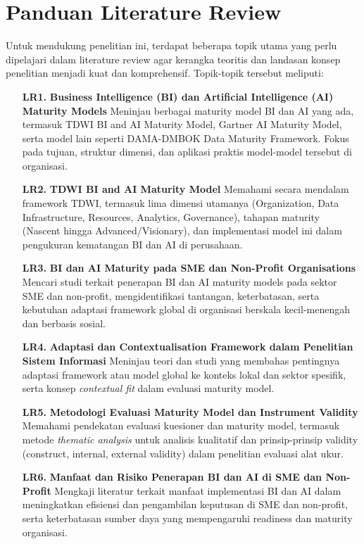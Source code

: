 \documentclass{article}
\begin{document}
\section{Panduan Literature Review}
Untuk mendukung penelitian ini, terdapat beberapa topik utama yang perlu dipelajari dalam literature review agar kerangka teoritis dan landasan konsep penelitian menjadi kuat dan komprehensif. Topik-topik tersebut meliputi:

\begin{enumerate}
	\item[\textbf{LR1.}] \textbf{Business Intelligence (BI) dan Artificial Intelligence (AI) Maturity Models}  
	Meninjau berbagai maturity model BI dan AI yang ada, termasuk TDWI BI and AI Maturity Model, Gartner AI Maturity Model, serta model lain seperti DAMA-DMBOK Data Maturity Framework. Fokus pada tujuan, struktur dimensi, dan aplikasi praktis model-model tersebut di organisasi.
	
	\item[\textbf{LR2.}] \textbf{TDWI BI and AI Maturity Model}  
	Memahami secara mendalam framework TDWI, termasuk lima dimensi utamanya (Organization, Data Infrastructure, Resources, Analytics, Governance), tahapan maturity (Nascent hingga Advanced/Visionary), dan implementasi model ini dalam pengukuran kematangan BI dan AI di perusahaan.
	
	\item[\textbf{LR3.}] \textbf{BI dan AI Maturity pada SME dan Non-Profit Organisations}  
	Mencari studi terkait penerapan BI dan AI maturity models pada sektor SME dan non-profit, mengidentifikasi tantangan, keterbatasan, serta kebutuhan adaptasi framework global di organisasi berskala kecil-menengah dan berbasis sosial.
	
	\item[\textbf{LR4.}] \textbf{Adaptasi dan Contextualisation Framework dalam Penelitian Sistem Informasi}  
	Meninjau teori dan studi yang membahas pentingnya adaptasi framework atau model global ke konteks lokal dan sektor spesifik, serta konsep \textit{contextual fit} dalam evaluasi maturity model.
	
	\item[\textbf{LR5.}] \textbf{Metodologi Evaluasi Maturity Model dan Instrument Validity}  
	Memahami pendekatan evaluasi kuesioner dan maturity model, termasuk metode \textit{thematic analysis} untuk analisis kualitatif dan prinsip-prinsip validity (construct, internal, external validity) dalam penelitian evaluasi alat ukur.
	
	\item[\textbf{LR6.}] \textbf{Manfaat dan Risiko Penerapan BI dan AI di SME dan Non-Profit}  
	Mengkaji literatur terkait manfaat implementasi BI dan AI dalam meningkatkan efisiensi dan pengambilan keputusan di SME dan non-profit, serta keterbatasan sumber daya yang mempengaruhi readiness dan maturity organisasi.
\end{enumerate}
\end{document}
